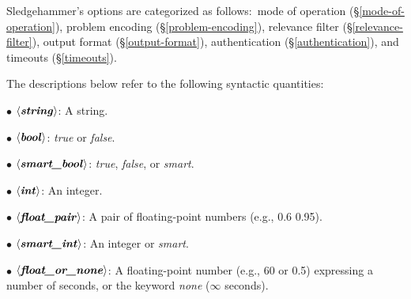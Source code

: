 \documentclass[a4paper,12pt]{article}
\def\qtybf#1{$\mathbf{\left<\textbf{\textit{#1\/}}\right>}$}
\begin{document}
\def\flushitem#1{\item[]\noindent\kern-\leftmargin \textbf{#1}}
\def\optrue#1#2{\flushitem{\textit{#1} $\bigl[$= \qtybf{bool}$\bigr]$\enskip \defl\textit{true}\defr\hfill (neg.: \textit{#2})}\nopagebreak\\[\parskip]}
\def\opfalse#1#2{\flushitem{\textit{#1} $\bigl[$= \qtybf{bool}$\bigr]$\enskip \defl\textit{false}\defr\hfill (neg.: \textit{#2})}\nopagebreak\\[\parskip]}
\def\opsmart#1#2{\flushitem{\textit{#1} $\bigl[$= \qtybf{smart\_bool}$\bigr]$\enskip \defl\textit{smart}\defr\hfill (neg.: \textit{#2})}\nopagebreak\\[\parskip]}
\def\opnodefault#1#2{\flushitem{\textit{#1} = \qtybf{#2}} \nopagebreak\\[\parskip]}
\def\opnodefaultbrk#1#2{\flushitem{$\bigl[$\textit{#1} =$\bigr]$ \qtybf{#2}} \nopagebreak\\[\parskip]}
\def\opdefault#1#2#3{\flushitem{\textit{#1} = \qtybf{#2}\enskip \defl\textit{#3}\defr} \nopagebreak\\[\parskip]}
\def\oparg#1#2#3{\flushitem{\textit{#1} \qtybf{#2} = \qtybf{#3}} \nopagebreak\\[\parskip]}
\def\opargbool#1#2#3{\flushitem{\textit{#1} \qtybf{#2} $\bigl[$= \qtybf{bool}$\bigr]$\hfill (neg.: \textit{#3})}\nopagebreak\\[\parskip]}
\def\opargboolorsmart#1#2#3{\flushitem{\textit{#1} \qtybf{#2} $\bigl[$= \qtybf{smart\_bool}$\bigr]$\hfill (neg.: \textit{#3})}\nopagebreak\\[\parskip]}

Sledgehammer's options are categorized as follows:\ mode of operation
(\S\ref{mode-of-operation}), problem encoding (\S\ref{problem-encoding}),
relevance filter (\S\ref{relevance-filter}), output format
(\S\ref{output-format}), authentication (\S\ref{authentication}), and timeouts
(\S\ref{timeouts}).

The descriptions below refer to the following syntactic quantities:

\begin{enum}
\item[$\bullet$] \qtybf{string}: A string.
\item[$\bullet$] \qtybf{bool\/}: \textit{true} or \textit{false}.
\item[$\bullet$] \qtybf{smart\_bool\/}: \textit{true}, \textit{false}, or
\textit{smart}.
\item[$\bullet$] \qtybf{int\/}: An integer.
\item[$\bullet$] \qtybf{float\_pair\/}: A pair of floating-point numbers
(e.g., 0.6 0.95).
\item[$\bullet$] \qtybf{smart\_int\/}: An integer or \textit{smart}.
\item[$\bullet$] \qtybf{float\_or\_none\/}: A floating-point number (e.g., 60 or
0.5) expressing a number of seconds, or the keyword \textit{none} ($\infty$
seconds).
\end{enum}
\end{document}
